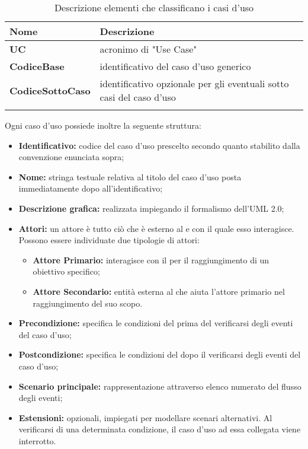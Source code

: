 \setlength{\freewidth}{\dimexpr\textwidth-0\tabcolsep}
	\renewcommand{\arraystretch}{1.5}
	\setlength{\aboverulesep}{0pt}
	\setlength{\belowrulesep}{0pt}
	\begin{longtable}{L{.2\freewidth} L{.6\freewidth} L{.080\freewidth}}
		\toprule 
		\textbf{Nome} & \textbf{Descrizione} \\
		\toprule
		\endhead		
		\textbf{UC} & acronimo di "Use Case" \\
		\textbf{CodiceBase} & identificativo del caso d'uso generico \\
		\textbf{CodiceSottoCaso} & identificativo opzionale per gli eventuali sotto casi del caso d'uso \\
		\bottomrule
		\hiderowcolors
		\caption{Descrizione elementi che classificano i casi d'uso}
	\end{longtable}

Ogni caso d'uso possiede inoltre la seguente struttura:
\begin{itemize}
	\item \textbf{Identificativo:} codice del caso d'uso prescelto secondo quanto stabilito dalla convenzione enunciata sopra;
	\item \textbf{Nome:} stringa testuale relativa al titolo del caso d'uso posta immediatamente dopo all'identificativo;
	\item \textbf{Descrizione grafica:} realizzata impiegando il formalismo dell'UML 2.0;
	\item \textbf{Attori:} un attore è tutto ciò che è esterno al  e con il quale esso interagisce. Possono essere individuate due tipologie di attori:
	\begin{itemize}
		\item \textbf{Attore Primario:} interagisce con il  per il raggiungimento di un obiettivo specifico;
		\item \textbf{Attore Secondario:} entità esterna al  che aiuta l'attore primario nel raggiungimento del suo scopo.
	\end{itemize}
	\item \textbf{Precondizione:} specifica le condizioni del  prima del verificarsi degli eventi del caso d'uso;
	\item \textbf{Postcondizione:} specifica le condizioni del  dopo il verificarsi degli eventi del caso d'uso;
	\item \textbf{Scenario principale:} rappresentazione attraverso elenco numerato del flusso degli eventi;
	\item \textbf{Estensioni:} opzionali, impiegati per modellare scenari alternativi. Al verificarsi di una determinata condizione, il caso d'uso ad essa collegata viene interrotto.
\end{itemize}
